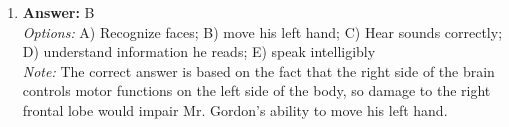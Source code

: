 \documentclass[12pt]{article}
\begin{document}
\begin{enumerate}[label=\arabic*.]
\\ \textit{Options:} A) hormonal changes; B) innate abilities; C) genetic traits; D) environments; E) educational backgrounds
\\ \textit{Note:} The correct answer is environments because the contrasting behaviors of identical twins raised apart highlight the significant role that environmental factors play in shaping individual differences, as their genetic makeup remains constant.
\item \textbf{Answer:} B
\\ \textit{Options:} A) Recognize faces; B) move his left hand; C) Hear sounds correctly; D) understand information he reads; E) speak intelligibly
\\ \textit{Note:} The correct answer is based on the fact that the right side of the brain controls motor functions on the left side of the body, so damage to the right frontal lobe would impair Mr. Gordon's ability to move his left hand.
\end{enumerate}
\end{document}
